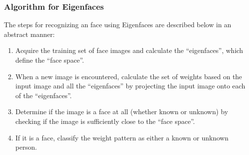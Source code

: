 \documentclass[12pt]{article}			%
\begin{document}
\subsubsection{ Algorithm for Eigenfaces }
The steps for recognizing an face using Eigenfaces are described below in an abstract manner:
\begin{enumerate}
\item Acquire the training set of face images and calculate the “eigenfaces”, which define the “face space”. 
\item When a new image is encountered, calculate the set of weights based on the input image and all the “eigenfaces” by projecting the input image onto each of the “eigenfaces”.
\item Determine if the image is a face at all (whether known or unknown) by checking if the image is sufficiently close to the “face space”. 
\item If it is a face, classify the weight pattern as either a known or unknown person. 
\end{enumerate}
\end{document}
